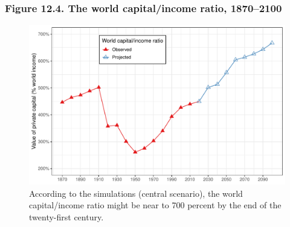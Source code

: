 \documentclass[t]{beamer}\usepackage[]{graphicx}\usepackage[]{color}
\newenvironment{knitrout}{}{} %
\begin{document}
\begin{frame}[label=Figure_12_4]
\frametitle{Figure 12.4. The world capital/income ratio, 1870--2100}
\begin{figure}[t]
\begin{minipage}[b]{\textwidth}
\centering
\begin{knitrout}\footnotesize
{}\color{fgcolor}

{\centering \includegraphics[width=1\linewidth]{figures/color/Figure_12_4} 

}



\end{knitrout}
\caption{According to the simulations (central scenario), the world capital/income ratio might be near to 700 percent by the end of the twenty-first century.}
\end{minipage}
\end{figure}
\end{frame}
\end{document}
